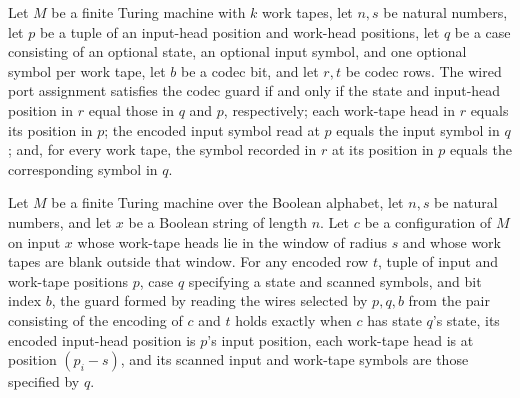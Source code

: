 \begin{theorem}
\label{Complexity.codecGuard_rows}
\leanok
{}
Let $M$ be a finite Turing machine with $k$ work tapes, let $n,s$ be natural numbers,
let $p$ be a tuple of an input-head position and work-head positions, let $q$ be a case
consisting of an optional state, an optional input symbol, and one optional symbol per
work tape, let $b$ be a codec bit, and let $r,t$ be codec rows. The wired port
assignment satisfies the codec guard if and only if the state and input-head position in
$r$ equal those in $q$ and $p$, respectively; each work-tape head in $r$ equals its
position in $p$; the encoded input symbol read at $p$ equals the input symbol in $q$;
and, for every work tape, the symbol recorded in $r$ at its position in $p$ equals the
corresponding symbol in $q$.
\end{theorem}

\begin{theorem}
\label{Complexity.codecGuard_spec}
\leanok
{}
Let $M$ be a finite Turing machine over the Boolean alphabet, let $n,s$ be natural
numbers, and let $x$ be a Boolean string of length $n$. Let $c$ be a configuration of
$M$ on input $x$ whose work-tape heads lie in the window of radius $s$ and whose work
tapes are blank outside that window. For any encoded row $t$, tuple of input and
work-tape positions $p$, case $q$ specifying a state and scanned symbols, and bit index
$b$, the guard formed by reading the wires selected by $p,q,b$ from the pair consisting
of the encoding of $c$ and $t$ holds exactly when $c$ has state $q$'s state, its encoded
input-head position is $p$'s input position, each work-tape head is at position
$(p_i-s)$, and its scanned input and work-tape symbols are those specified by $q$.
\end{theorem}

